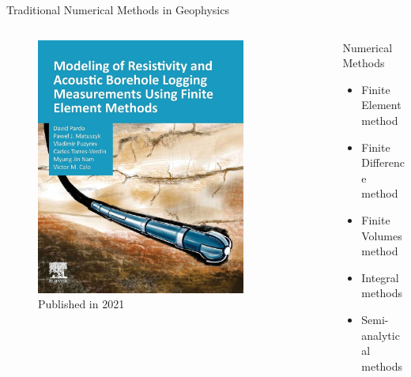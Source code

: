\begin{frame}{Traditional Numerical Methods in Geophysics}
  \begin{columns}[T,onlytextwidth]
  
    \begin{column}{0.48\textwidth}
      \begin{figure}
        \centering %
        \includegraphics[width=0.8\textwidth]{Diapos/Intro/Figures/PardoBook.jpg} %
        \caption{Published in 2021} %
        \label{fig:book} %
      \end{figure}
    \end{column}
    
    \begin{column}{0.48\textwidth}
      \begin{block}{Numerical Methods}
        \begin{itemize}
          \setlength\itemsep{2.4em} %
          \item Finite Element method
          \item Finite Difference method
          \item Finite Volumes method
          \item Integral methods
          \item Semi-analytical methods
        \end{itemize}
      \end{block}
    \end{column}
    
  \end{columns}
\end{frame}
